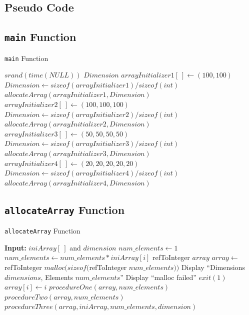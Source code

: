 \documentclass[10pt, conference]{IEEEtran}
\begin{document}
\begin{appendices}
\twocolumn
\section{Pseudo Code}
\label{Pseudo Appendix}
\subsection{\texttt{main} Function}

\begin{algorithm}[h!]
\caption{\texttt{main} Function}
\label{Main}
\begin{algorithmic} 

\STATE $srand(time(NULL))$
\STATE $Dimension$
\STATE $arrayInitializer1[\ ] \leftarrow (100, 100)$
\STATE $Dimension \leftarrow sizeof(arrayInitializer1)/sizeof(int)$
\STATE $allocateArray(arrayInitializer1, Dimension)$
\STATE
\STATE $arrayInitializer2[\ ] \leftarrow (100, 100, 100)$
\STATE $Dimension \leftarrow sizeof(arrayInitializer2)/sizeof(int)$
\STATE $allocateArray(arrayInitializer2, Dimension)$
\STATE
\STATE $arrayInitializer3[\ ] \leftarrow (50, 50, 50, 50)$
\STATE $Dimension \leftarrow sizeof(arrayInitializer3)/sizeof(int)$
\STATE $allocateArray(arrayInitializer3, Dimension)$
\STATE
\STATE $arrayInitializer4[\ ] \leftarrow (20, 20, 20, 20, 20)$
\STATE $Dimension \leftarrow sizeof(arrayInitializer4)/sizeof(int)$
\STATE $allocateArray(arrayInitializer4, Dimension)$

\end{algorithmic}
\end{algorithm}

\subsection{\texttt{allocateArray} Function}

\begin{algorithm}[h!]
\caption{\texttt{allocateArray} Function}
\label{allocateArray}
\begin{algorithmic} 

\STATE \textbf{Input:} $iniArray[\ ]$ and $dimension$
\STATE
\STATE $num\_elements \leftarrow 1$
	\STATE $num\_elements \leftarrow num\_elements * iniArray[i]$
\ENDFOR
\STATE refToInteger $array$
\STATE $array \leftarrow$ refToInteger $malloc(sizeof($refToInteger $num\_elements))$
\STATE Display ``Dimensions $dimensions$, Elements $num\_elements$''
	\STATE Display ``malloc failed''
	\STATE $exit(1)$
\ENDIF
\STATE
{}
	\STATE $array[i] \leftarrow i$
\ENDFOR
\STATE $procedureOne(array, num\_elements)$
\STATE $procedureTwo(array, num\_elements)$
\STATE $procedureThree(array, iniArray, num\_elements, dimension)$


\end{algorithmic}
\end{algorithm}
\end{appendices}
\end{document}
